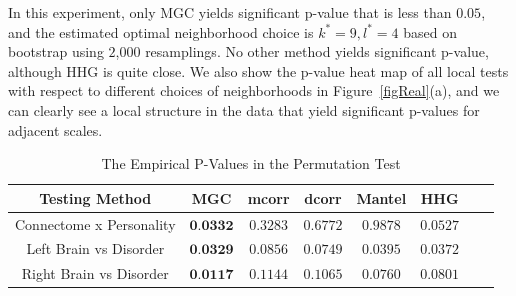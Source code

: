 \documentclass[11pt]{article}
\begin{document}
In this experiment, only MGC yields significant p-value that is less than $0.05$, and the estimated optimal neighborhood choice is $k^{*}=9, l^{*}=4$ based on bootstrap using $2$,$000$ resamplings. No other method yields significant p-value, although HHG is quite close. We also show the p-value heat map of all local tests with respect to different choices of neighborhoods in Figure~\ref{figReal}(a), and we can clearly see a local structure in the data that yield significant p-values for adjacent scales.



\begin{table}[!t]
\footnotesize
\renewcommand{\arraystretch}{0.5}
\centering
{\begin{tabular}{|c||c|c|c|c|c|c|c|}
\hline
Testing Method & MGC & mcorr & dcorr & Mantel & HHG \\
\hline
Connectome x Personality & $\textbf{0.0332}$ & $0.3283$ & $0.6772$ & $0.9878$  & $0.0527$ \\
\hline
Left Brain vs Disorder  & $\textbf{0.0329}$ & $0.0856$ & $0.0749$ & $0.0395$ & $0.0372$ \\
\hline
Right Brain vs Disorder & $\textbf{0.0117}$ & $0.1144$ & $0.1065$  & $0.0760$ & $0.0801$\\
\hline
\end{tabular}
\caption{The Empirical P-Values in the Permutation Test}
\label{table1}
}
\end{table}
\end{document}
